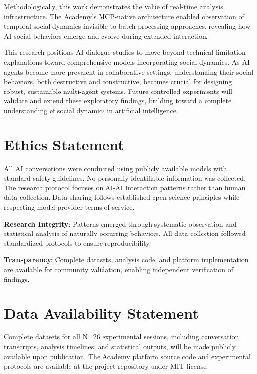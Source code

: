 \documentclass[11pt,letterpaper]{article}
\newcommand{\theacademy}{The Academy}
\newcommand{\exponedataTotalSessionsRaw}{26}
\newcommand{\exponedataTotalSessions}{N=\exponedataTotalSessionsRaw}
\begin{document}
Methodologically, this work demonstrates the value of real-time analysis infrastructure. \theacademy{}'s MCP-native architecture enabled observation of temporal social dynamics invisible to batch-processing approaches, revealing how AI social behaviors emerge and evolve during extended interaction.

This research positions AI dialogue studies to move beyond technical limitation explanations toward comprehensive models incorporating social dynamics. As AI agents become more prevalent in collaborative settings, understanding their social behaviors, both destructive and constructive, becomes crucial for designing robust, sustainable multi-agent systems. Future controlled experiments will validate and extend these exploratory findings, building toward a complete understanding of social dynamics in artificial intelligence.

\section*{Ethics Statement}

All AI conversations were conducted using publicly available models with standard safety guidelines. No personally identifiable information was collected. The research protocol focuses on AI-AI interaction patterns rather than human data collection. Data sharing follows established open science principles while respecting model provider terms of service.

\textbf{Research Integrity}: Patterns emerged through systematic observation and statistical analysis of naturally occurring behaviors. All data collection followed standardized protocols to ensure reproducibility.

\textbf{Transparency}: Complete datasets, analysis code, and platform implementation are available for community validation, enabling independent verification of findings.

\section*{Data Availability Statement}

Complete datasets for all \exponedataTotalSessions{} experimental sessions, including conversation transcripts, analysis timelines, and statistical outputs, will be made publicly available upon publication. \theacademy{} platform source code and experimental protocols are available at the project repository under MIT license.
\end{document}
